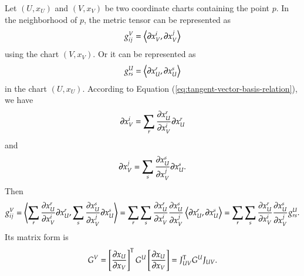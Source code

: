 \documentclass[11pt, a4paper]{book}
\begin{document}
Let $(U,x_U)$ and $(V,x_V)$ be two coordinate charts containing the point $p$. In the
neighborhood of $p$, the metric tensor can be represented as
\begin{equation*}
  g_{ij}^V = \left\langle \boldsymbol{\partial}x_V^i, \boldsymbol{\partial}x_V^j \right\rangle
\end{equation*}
using the chart $(V,x_V)$. Or it can be represented as
\begin{equation*}
  g_{rs}^U = \left\langle \boldsymbol{\partial}x_U^r, \boldsymbol{\partial}x_U^s \right\rangle
\end{equation*}
in the chart $(U,x_U)$. According to Equation (\ref{eq:tangent-vector-basis-relation}), we
have
\begin{equation*}
  \boldsymbol{\partial}x_V^i = \sum_r \frac{\partial x_U^r}{\partial x_V^i} \boldsymbol{\partial}x_U^r
\end{equation*}
and
\begin{equation*}
  \boldsymbol{\partial}x_V^j = \sum_s \frac{\partial x_U^s}{\partial x_V^j} \boldsymbol{\partial}x_U^s.
\end{equation*}
Then
\begin{equation}
  \label{eq:metric-tensor-transformation}
  g_{ij}^V = \left\langle \sum_r \frac{\partial x_U^r}{\partial x_V^i} \boldsymbol{\partial}x_U^r,
    \sum_s \frac{\partial x_U^s}{\partial x_V^j} \boldsymbol{\partial}x_U^s \right\rangle =
  \sum_r\sum_s \frac{\partial x_U^r}{\partial x_V^i} \frac{\partial x_U^s}{\partial x_V^j}
  \left\langle \boldsymbol{\partial}x_U^r, \boldsymbol{\partial}x_U^s \right\rangle = \sum_r\sum_s
  \frac{\partial x_U^r}{\partial x_V^i} \frac{\partial x_U^s}{\partial x_V^j} g_{rs}^U.
\end{equation}
Its matrix form is
\begin{equation}
  \label{eq:metric-tensor-transformation-matrix-form}
  G^V = \left[ \frac{\partial x_U}{\partial x_V} \right]^{\mathrm{T}} G^U \left[ \frac{\partial
      x_U}{\partial x_V} \right] = J_{UV}^{\mathrm{T}} G^U J_{UV}.
\end{equation}
\end{document}
